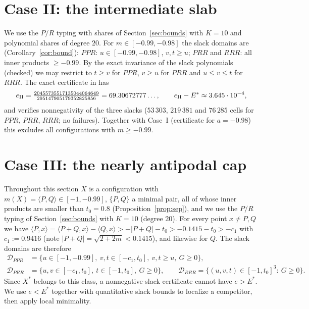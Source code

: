 \documentclass[11pt]{article}
\theoremstyle{definition}
\newcommand{\ip}[2]{\langle #1,#2\rangle}
\newcommand{\Xs}{X^{\ast}}
\newcommand{\Es}{E^{\ast}}
\begin{document}
\section{Case II: the intermediate slab}\label{sec:slabs}
We use the $P/R$ typing with shares of Section~\ref{sec:bounds} with $K=10$ and polynomial shares of degree $20$.
For $m\in[-0.99,-0.98]$ the slack domains are (Corollary~\ref{cor:bound}):
$PPR$: $u\in[-0.99,-0.98]$, $v,t\ge u$; $PRR$ and $RRR$: all inner products $\ge-0.99$.
By the exact invariance of the slack polynomials (checked) we may restrict to $t\ge v$ for $PPR$, $v\ge u$ for $PRR$ and
$u\le v\le t$ for $RRR$. The exact certificate in  has
\[
 e_{\rm II}=\tfrac{20455735517135044064649}{295147905179352825856}=69.30672777\ldots,\qquad e_{\rm II}-\Es\approx3.645\cdot10^{-4},
\]
and  verifies nonnegativity of the three slacks ($53\,303$, $219\,381$ and $76\,285$ cells for $PPR$, $PRR$, $RRR$; no failures).
Together with Case~I (certificate for $a=-0.98$) this excludes all configurations with $m\ge-0.99$.

\section{Case III: the nearly antipodal cap}\label{sec:cap}
Throughout this section $X$ is a configuration with $m(X)=\ip PQ\in[-1,-0.99]$, $\{P,Q\}$ a minimal pair, all of whose
inner products are smaller than $t_0=0.8$ (Proposition~\ref{prop:sep}), and we use the $P/R$ typing of
Section~\ref{sec:bounds} with $K=10$ (degree $20$). For every point $x\ne P,Q$ we have
$\ip Px=\ip{P+Q}{x}-\ip Qx>-|P+Q|-t_0>-0.1415-t_0>-c_1$ with $c_1:=0.9416$ (note $|P+Q|=\sqrt{2+2m}<0.1415$), and
likewise for $Q$. The slack domains
are therefore
\begin{align*}
 \mathcal D_{PPR}&=\{u\in[-1,-0.99],\ v,t\in[-c_1,t_0],\ v,t\ge u,\ G\ge0\},\\
 \mathcal D_{PRR}&=\{u,v\in[-c_1,t_0],\ t\in[-1,t_0],\ G\ge0\},\qquad
 \mathcal D_{RRR}=\{(u,v,t)\in[-1,t_0]^3:\ G\ge0\}.
\end{align*}
Since $\Xs$ belongs to this class, a nonnegative-slack certificate cannot have $e>\Es$.
We use $e<\Es$ together with quantitative slack bounds to localize a competitor, then apply local minimality.
\end{document}
